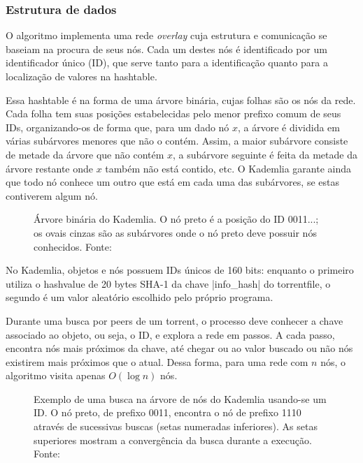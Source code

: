 
\subsubsection*{Estrutura de dados}

O algoritmo implementa uma rede \emph{overlay} cuja estrutura e comunicação se baseiam
na procura de seus nós. Cada um destes nós é identificado por um identificador único
(ID), que serve tanto para a identificação quanto para a localização de valores na
\gls*{hashtable}.

Essa \gls*{hashtable} é na forma de uma árvore binária, cujas folhas são os nós da rede.
Cada folha tem suas posições estabelecidas pelo menor prefixo comum de seus IDs,
organizando-os de forma que, para um dado nó $x$, a árvore é dividida em várias
subárvores menores que não o contém. Assim, a maior subárvore consiste de metade da
árvore que não contém $x$, a subárvore seguinte é feita da metade da árvore restante
onde $x$ também não está contido, etc. O Kademlia garante ainda que todo nó conhece um
outro que está em cada uma das subárvores, se estas contiverem algum nó.

\begin{figure}[ht!]
    \centering
    \caption{Árvore binária do Kademlia. O nó preto é a posição do ID 0011...; os ovais
    cinzas são as subárvores onde o nó preto deve possuir nós conhecidos. Fonte:
    \cite{artigo:kademlia}}
    \label{fig:dht-arvore}
\end{figure}

No Kademlia, objetos e nós possuem IDs únicos de 160 bits: enquanto o primeiro utiliza
o \gls*{hashvalue} de 20 bytes SHA-1 da chave \bverb|info_hash| do \gls*{torrentfile},
o segundo é um valor aleatório escolhido pelo próprio programa.

Durante uma busca por \glspl*{peer} de um \gls*{torrent}, o processo deve conhecer a
chave associado ao objeto, ou seja, o ID, e explora a rede em passos. A cada passo,
encontra nós mais próximos da chave, até chegar ou ao valor buscado ou não nós
existirem mais próximos que o atual. Dessa forma, para uma rede com $n$ nós, o
algoritmo visita apenas $O(\log n)$ nós.

\newpage
\begin{figure}[ht!]
    \centering
    \caption{Exemplo de uma busca na árvore de nós do Kademlia usando-se um ID. O nó
    preto, de prefixo 0011, encontra o nó de prefixo 1110 através de sucessivas buscas
    (setas numeradas inferiores). As setas superiores mostram a convergência da
    busca durante a execução. Fonte: \cite{artigo:kademlia}}
    \label{fig:dht-arvore-busca}
\end{figure}

